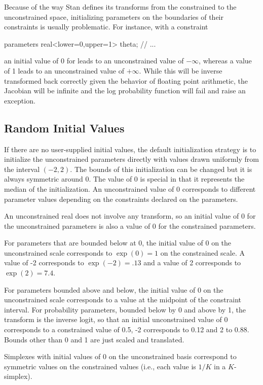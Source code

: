 Because of the way Stan defines its transforms from the constrained to
the unconstrained space, initializing parameters on the boundaries of
their constraints is usually problematic.  For instance, with a
constraint
%
\begin{stancode}
parameters {
  real<lower=0,upper=1> theta;
  // ...
}
\end{stancode}
%
an initial value of 0 for  leads to an unconstrained value
of $-\infty$, whereas a value of 1 leads to an unconstrained value of
$+\infty$.  While this will be inverse transformed back correctly
given the behavior of floating point arithmetic, the Jacobian will be
infinite and the log probability function will fail and raise an
exception.

\subsection{Random Initial Values}

If there are no user-supplied initial values, the default
initialization strategy is to initialize the unconstrained parameters
directly with values drawn uniformly from the interval $(-2,2)$.  The
bounds of this initialization can be changed but it is always
symmetric around 0. The value of 0 is special in that it represents
the median of the initialization.  An unconstrained value of 0
corresponds to different parameter values depending on the constraints
declared on the parameters.

An unconstrained real does not involve any transform, so an initial
value of 0 for the unconstrained parameters is also a value of 0 for
the constrained parameters.

For parameters that are bounded below at 0, the initial value of 0 on
the unconstrained scale corresponds to $\exp(0) = 1$ on the
constrained scale.  A value of -2 corresponds to $\exp(-2) = .13$ and
a value of 2 corresponds to $\exp(2) = 7.4$.

For parameters bounded above and below, the initial value of 0 on the
unconstrained scale corresponds to a value at the midpoint of the
constraint interval.  For probability parameters, bounded below by 0
and above by 1, the transform is the inverse logit, so that an initial
unconstrained value of 0 corresponds to a constrained value of 0.5, -2
corresponds to 0.12 and 2 to 0.88.  Bounds other than 0 and 1 are
just scaled and translated.

Simplexes with initial values of 0 on the unconstrained basis
correspond to symmetric values on the constrained values (i.e., each
value is $1/K$ in a $K$-simplex).

